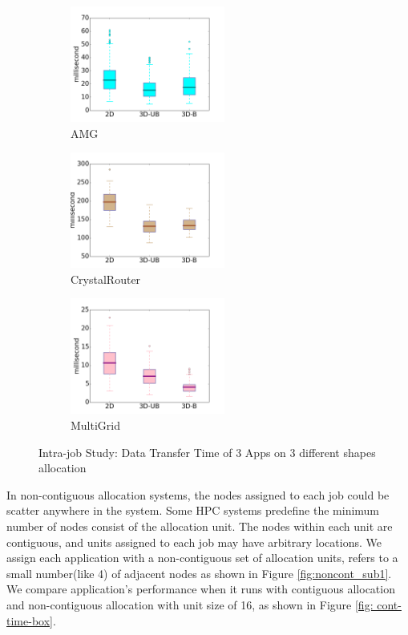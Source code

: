 \documentclass[conference]{IEEEtran}
\begin{document}
\begin{figure}[t!]
    \centering
    \begin{subfigure}[t]{0.32\textwidth}
        \centering
        \includegraphics[height=1.5in]{figs/intra-job/shapestudy/amg_box}
        \caption{AMG}
        \label{fig:shapstudy-amg}
    \end{subfigure}%
    \hspace{1em}%
    \begin{subfigure}[t]{0.32\textwidth}
        \centering
        \includegraphics[height=1.5in]{figs/intra-job/shapestudy/cr_box}
        \caption{CrystalRouter}
        \label{fig:shapstudy-cr}
    \end{subfigure}%
    \begin{subfigure}[t]{0.32\textwidth}
        \centering
        \includegraphics[height=1.5in]{figs/intra-job/shapestudy/mg_box}
        \caption{MultiGrid}
        \label{fig:shapstudy-mg}
    \end{subfigure}%
   \caption{Intra-job Study: Data Transfer Time of 3 Apps on 3 different shapes allocation}
   \label{fig: shapestudy}
\end{figure}


In non-contiguous allocation systems, the nodes assigned to each job could be scatter anywhere in the system. Some HPC systems predefine the minimum number of nodes consist of the allocation unit. The nodes within each unit are contiguous, and units assigned to each job may have arbitrary locations. We assign each application with a non-contiguous set of allocation units, refers to a small number(like 4) of adjacent nodes as shown in Figure \ref{fig:noncont_sub1}. We compare application's performance when it runs with contiguous allocation and non-contiguous allocation with unit size of 16, as shown in Figure \ref{fig: cont-time-box}. 
\end{document}
